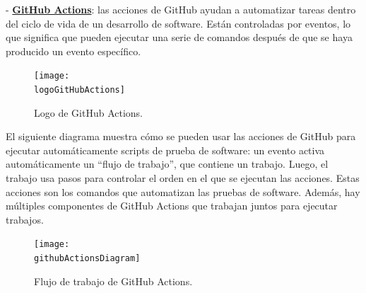 \newpage

- \textbf{\underline{GitHub Actions}}: las acciones de GitHub ayudan a automatizar tareas dentro del ciclo de vida de un desarrollo de software. Están controladas por eventos, lo que significa que pueden ejecutar una serie de comandos después de que se haya producido un evento específico.

\begin{figure}[h]
    \centering
    \texttt{[image: \\logoGitHubActions]}
    \caption{Logo de GitHub Actions.}
\end{figure}

El siguiente diagrama muestra cómo se pueden usar las acciones de GitHub para ejecutar automáticamente scripts de prueba de software: un evento activa automáticamente un “flujo de trabajo”, que contiene un trabajo. Luego, el trabajo usa pasos para controlar el orden en el que se ejecutan las acciones. Estas acciones son los comandos que automatizan las pruebas de software. Además, hay múltiples componentes de GitHub Actions que trabajan juntos para ejecutar trabajos.
\begin{figure}[h]
    \centering
    \texttt{[image: \\githubActionsDiagram]}
    \caption{Flujo de trabajo de GitHub Actions.}
\end{figure}



